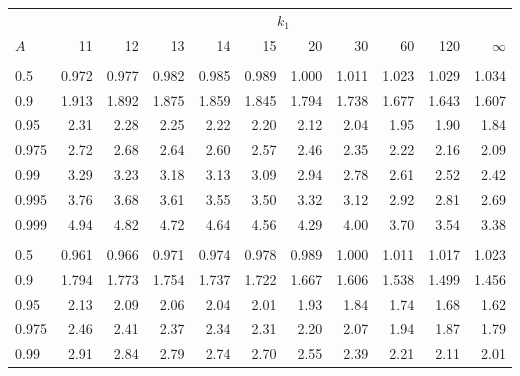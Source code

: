 \documentclass[]{article}
\begin{document}
\begin{table}[H]
\centering
\begin{tabular}{lrrrrrrrrrr}
\toprule
\multicolumn{1}{c}{ } & \multicolumn{10}{c}{$k_1$} \\
\cmidrule(l{3pt}r{3pt}){2-11}
\hspace{1.1em}$A$ & 11 & 12 & 13 & 14 & 15 & 20 & 30 & 60 & 120 & $\infty$\\
\midrule
\addlinespace[0.3em]
\multicolumn{11}{l}{\textbf{$k_2=20$}}\\
\hspace{1em}0.5 & 0.972 & 0.977 & 0.982 & 0.985 & 0.989 & 1.000 & 1.011 & 1.023 & 1.029 & 1.034\\
\hspace{1em}0.9 & 1.913 & 1.892 & 1.875 & 1.859 & 1.845 & 1.794 & 1.738 & 1.677 & 1.643 & 1.607\\
\hspace{1em}0.95 & 2.31 & 2.28 & 2.25 & 2.22 & 2.20 & 2.12 & 2.04 & 1.95 & 1.90 & 1.84\\
\hspace{1em}0.975 & 2.72 & 2.68 & 2.64 & 2.60 & 2.57 & 2.46 & 2.35 & 2.22 & 2.16 & 2.09\\
\hspace{1em}0.99 & 3.29 & 3.23 & 3.18 & 3.13 & 3.09 & 2.94 & 2.78 & 2.61 & 2.52 & 2.42\\
\hspace{1em}0.995 & 3.76 & 3.68 & 3.61 & 3.55 & 3.50 & 3.32 & 3.12 & 2.92 & 2.81 & 2.69\\
\hspace{1em}0.999 & 4.94 & 4.82 & 4.72 & 4.64 & 4.56 & 4.29 & 4.00 & 3.70 & 3.54 & 3.38\\
\addlinespace[0.3em]
\multicolumn{11}{l}{\textbf{$k_2=30$}}\\
\hspace{1em}0.5 & 0.961 & 0.966 & 0.971 & 0.974 & 0.978 & 0.989 & 1.000 & 1.011 & 1.017 & 1.023\\
\hspace{1em}0.9 & 1.794 & 1.773 & 1.754 & 1.737 & 1.722 & 1.667 & 1.606 & 1.538 & 1.499 & 1.456\\
\hspace{1em}0.95 & 2.13 & 2.09 & 2.06 & 2.04 & 2.01 & 1.93 & 1.84 & 1.74 & 1.68 & 1.62\\
\hspace{1em}0.975 & 2.46 & 2.41 & 2.37 & 2.34 & 2.31 & 2.20 & 2.07 & 1.94 & 1.87 & 1.79\\
\hspace{1em}0.99 & 2.91 & 2.84 & 2.79 & 2.74 & 2.70 & 2.55 & 2.39 & 2.21 & 2.11 & 2.01\\

\end{tabular}
\end{table}
\end{document}
